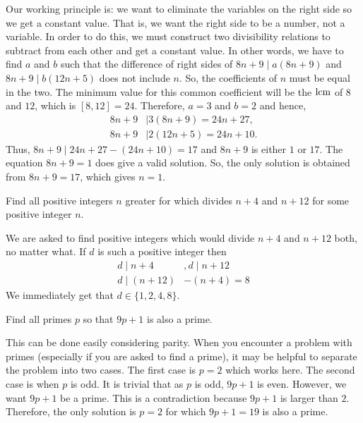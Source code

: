 \documentclass{subfile}
\begin{document}
		\begin{solution}
			Our working principle is: we want to eliminate the variables on the right side so we get a constant value. That is, we want the right side to be a number, not a variable. In order to do this, we must construct two divisibility relations to subtract from each other and get a constant value. In other words, we have to find $a$ and $b$ such that the difference of right sides of $8n+9 \mid a(8n+9)$ and $8n+9 \mid b(12n+5)$ does not include $n$. So, the coefficients of $n$ must be equal in the two. The minimum value for this common coefficient will be the $\operatorname{lcm}$ of $8$ and $12$, which is $[8,12]=24$. Therefore, $a=3$ and $b=2$ and hence,
				\begin{align*}
					8n+9 & \mid 3(8n+9) =24n+27,\\
					8n+9 & \mid 2(12n+5) =24n+10.
				\end{align*}
			Thus, $8n+9\mid 24n+27-(24n+10)=17$ and $8n+9$ is either $1$ or $17$. The equation $8n+9=1$ does give a valid solution. So, the only solution is obtained from $8n+9=17$, which gives $n=1$.
		\end{solution}

		\begin{problem}
			Find all positive integers $n$ greater for which divides $n+4$ and $n+12$ for some positive integer $n$.
		\end{problem}

		\begin{solution}
			We are asked to find positive integers which would divide $n+4$ and $n+12$ both, no matter what. If $d$ is such a positive integer then
				\begin{align*}
					d\mid n+4 & , d\mid n+12\\
					d\mid (n+12)&-(n+4)=8
				\end{align*}
			We immediately get that $d\in\{1,2,4,8\}$.
		\end{solution}

		\begin{problem}
			Find all primes $p$ so that $9p+1$ is also a prime.
		\end{problem}

		\begin{solution}
			This can be done easily considering parity. When you encounter a problem with primes (especially if you are asked to find a prime), it may be helpful to separate the problem into two cases. The first case is $p=2$ which works here. The second case is when $p$ is odd. It is trivial that as $p$ is odd, $9p+1$ is even. However, we want $9p+1$ be a prime. This is a contradiction because $9p+1$ is larger than $2$. Therefore, the only solution is $p=2$ for which $9p+1=19$ is also a prime.
		\end{solution}
\end{document}
